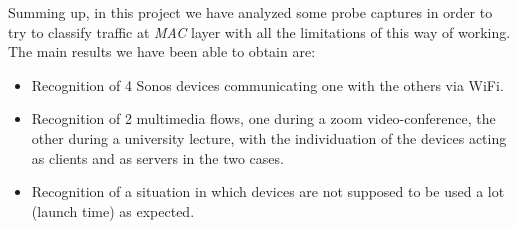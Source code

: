 Summing up, in this project we have analyzed some probe captures in order to try to classify traffic at \textit{MAC} layer with 
all the limitations of this way of working.\\ 
The main results we have been able to obtain are:
\begin{itemize}
    \item Recognition of 4 Sonos devices communicating one with the others via WiFi.
    \item Recognition of 2 multimedia flows, one during a zoom video-conference, the other during a university lecture,
            with the individuation of the devices acting as clients and as servers in the two cases.
    \item Recognition of a situation in which devices are not supposed to be used a lot (launch time) as expected.
\end{itemize}